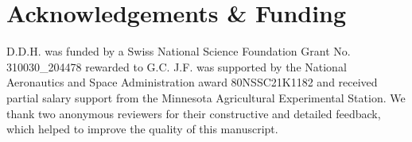 \documentclass[abstract=on,10pt,a4paper,bibliography=totocnumbered]{article}
\begin{document}
\section{Acknowledgements \& Funding}

D.D.H. was funded by a Swiss National Science Foundation Grant No.
310030\_204478 rewarded to G.C. J.F. was supported by the National Aeronautics
and Space Administration award 80NSSC21K1182 and received partial salary support
from the Minnesota Agricultural Experimental Station. We thank two anonymous
reviewers for their constructive and detailed feedback, which helped to improve
the quality of this manuscript.

\newpage
\begingroup
\singlespacing
{}
\endgroup
\end{document}
